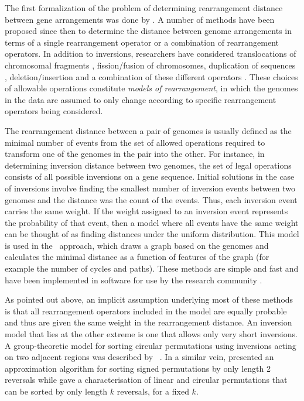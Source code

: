 \documentclass[utf8]{Frontiers_LaTex_Templates/frontiersFPHY} %
\numberwithin{equation}{section}
\begin{document}
The first formalization of the problem of determining rearrangement distance between gene arrangements was done by \citet{watterson1982chromosome}. A number of methods have been proposed since then to determine the distance between genome arrangements in terms of a single rearrangement operator or a combination of rearrangement operators. In addition to inversions, researchers have considered translocations of chromosomal fragments \citep{bafna1995sorting,bafna1998sorting,yin2013sorting}, fission/fusion of chromosomes, duplication of sequences \citep{chaudhuri2006tandem}, deletion/insertion and a combination of these different operators \citep{yancopoulos2005efficient}. These choices of allowable operations constitute \emph{models of rearrangement}, in which the genomes in the data are assumed to only change according to specific rearrangement operators being considered.

The rearrangement distance between a pair of genomes is usually defined as the minimal number of events from the set of allowed operations required to transform one of the genomes in the pair into the other. For instance, in determining inversion distance between two genomes, the set of legal operations consists of all possible inversions on a gene sequence.  Initial solutions in the case of inversions involve finding the smallest number of inversion events between two genomes and the distance was the count of the events. Thus, each inversion event carries the same weight. If the weight assigned to an inversion event represents the probability of that event, then a model where all events have the same weight can be thought of as finding distances under the uniform distribution.  This model is used in the~\citet{hannenhalli1999transforming} approach, which draws a graph based on the genomes and calculates the minimal distance as a function of features of the graph (for example the number of cycles and paths). 
% 
These methods are simple and fast and have been implemented in software for use by the research community \citep{sankoff1991derange,tesler2002grimm,shao2014exact}. 

As pointed out above, an implicit assumption underlying most of these methods is that all rearrangement operators included in the model are equally probable and thus are given the same weight in the rearrangement distance. 
An inversion model that lies at the other extreme is one that allows only very short inversions. 
A group-theoretic model for sorting circular permutations using inversions acting on two adjacent regions was described by ~\citet{egrinagy2013group}. In a similar vein, \citet{galvao2015sorting} presented an approximation algorithm for sorting signed permutations by only length 2 reversals while \citet{chen1996sorting} gave a characterisation of linear and circular permutations that can be sorted by only length $k$ reversals, for a fixed $k$. 
\end{document}
